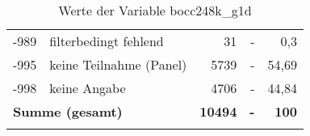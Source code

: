 \begin{longtable}{Xlrrr}
       -989 & filterbedingt fehlend & 31 & - & 0,3 \\

       -995 & keine Teilnahme (Panel) & 5739 & - & 54,69 \\

       -998 & keine Angabe & 4706 & - & 44,84 \\

     \midrule
     \multicolumn{2}{l}{\textbf{Summe (gesamt)}} & \textbf{10494} & \textbf{-} & \textbf{100} \\
     \bottomrule
     \caption{Werte der Variable bocc248k\_g1d}
     \end{longtable}
     
